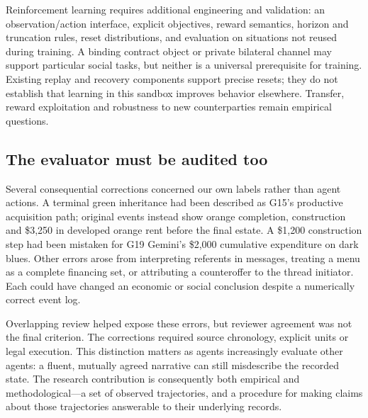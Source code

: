 Reinforcement learning requires additional engineering and validation: an observation/action interface, explicit objectives, reward semantics, horizon and truncation rules, reset distributions, and evaluation on situations not reused during training. A binding contract object or private bilateral channel may support particular social tasks, but neither is a universal prerequisite for training. Existing replay and recovery components support precise resets; they do not establish that learning in this sandbox improves behavior elsewhere. Transfer, reward exploitation and robustness to new counterparties remain empirical questions.

\subsection{The evaluator must be audited too}

Several consequential corrections concerned our own labels rather than agent actions. A terminal green inheritance had been described as G15's productive acquisition path; original events instead show orange completion, construction and \$3,250 in developed orange rent before the final estate. A \$1,200 construction step had been mistaken for G19 Gemini's \$2,000 cumulative expenditure on dark blues. Other errors arose from interpreting referents in messages, treating a menu as a complete financing set, or attributing a counteroffer to the thread initiator. Each could have changed an economic or social conclusion despite a numerically correct event log.

Overlapping review helped expose these errors, but reviewer agreement was not the final criterion. The corrections required source chronology, explicit units or legal execution. This distinction matters as agents increasingly evaluate other agents: a fluent, mutually agreed narrative can still misdescribe the recorded state. The research contribution is consequently both empirical and methodological---a set of observed trajectories, and a procedure for making claims about those trajectories answerable to their underlying records.

